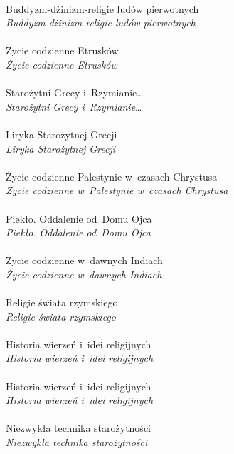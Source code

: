 \documentclass[a4paper,11pt]{article}
\begin{document}
 \\
\Jest  Buddyzm-dżinizm-religie ludów pierwotnych \\
\Powin \textit{Buddyzm-dżinizm-religie ludów pierwotnych} \\
 \\
\Jest  Życie codzienne Etrusków \\
\Powin \textit{Życie codzienne Etrusków} \\
 \\
\Jest  Starożytni Grecy i~Rzymianie\ldots \\
\Powin \textit{Starożytni Grecy i~Rzymianie}\ldots \\
 \\
\Jest  Liryka Starożytnej Grecji \\
\Powin \textit{Liryka Starożytnej Grecji} \\
 \\
\Jest  Życie codzienne Palestynie w~czasach Chrystusa \\
\Powin \textit{Życie codzienne w~Palestynie w~czasach Chrystusa} \\
 \\
\Jest  Piekło. Oddalenie od~Domu Ojca \\
\Powin \textit{Piekło. Oddalenie od~Domu Ojca} \\
 \\
\Jest  Życie codzienne w~dawnych Indiach \\
\Powin \textit{Życie codzienne w~dawnych Indiach} \\
 \\
\Jest  Religie świata rzymskiego \\
\Powin \textit{Religie świata rzymskiego} \\
 \\
\Jest  Historia wierzeń i~idei religijnych \\
\Powin \textit{Historia wierzeń i~idei religijnych} \\
 \\
\Jest  Historia wierzeń i~idei religijnych \\
\Powin \textit{Historia wierzeń i~idei religijnych} \\
 \\
\Jest  Niezwykła technika starożytności \\
\Powin \textit{Niezwykła technika starożytności} \\
\end{document}
